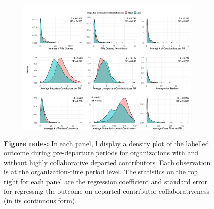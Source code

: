 \begin{figure}[ht]
  \centering

    \caption{Pre-departure outcome distribution}\label{fig:tradeoffs}
  \medskip
  \begin{subfigure}[b]{0.9\textwidth}
    \centering
    \includegraphics[width=\textwidth]{temp/output/collab_outcomes.png}
  \end{subfigure}

    \bigskip
  \vspace{1ex}
  \centering
  \begin{minipage}{0.9\textwidth}
    \textbf{Figure notes:} In each panel, I display a density plot of the labelled outcome during pre-departure periods for organizations with and without highly collaborative departed contributors. Each observation is at the organization-time period level. The statistics on the rop right for each panel are the regression coefficient and standard error for regressing the outcome on departed contributor collaborativeness (in its continuous form). 
  \end{minipage}


\end{figure}
\pagebreak